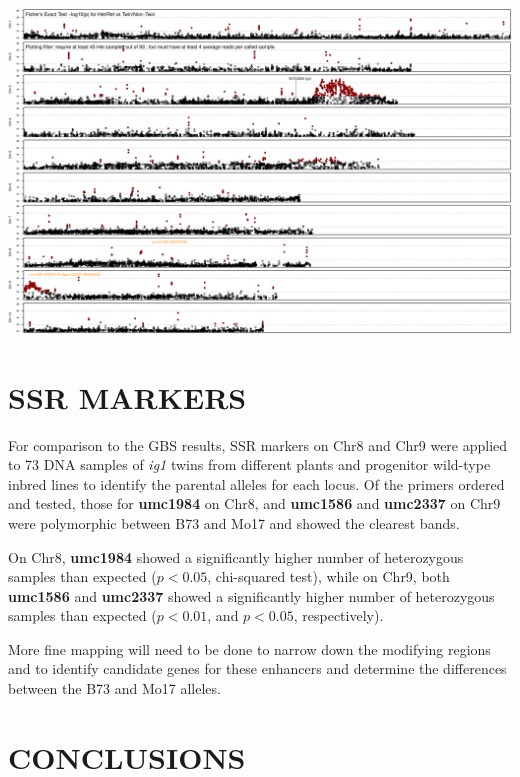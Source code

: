 \documentclass[maize,portrait]{a0poster}
\newlength{\figwidth}
\begin{document}
\begin{multicols}{3}
  \begin{center}
    \includegraphics[width=\figwidth]{Fisher-Het-45}
  \end{center}


  \section*{SSR MARKERS}

  For comparison to the GBS results, SSR markers on Chr8 and Chr9 were applied to 73 DNA samples of \textit{ig1}
  twins from different plants and progenitor wild-type inbred lines to identify the parental alleles for each locus.
  Of the primers ordered and tested, those for \textbf{umc1984} on Chr8, and \textbf{umc1586} and \textbf{umc2337} on Chr9
  were polymorphic between B73 and Mo17 and showed the clearest bands.
  
  On Chr8, \textbf{umc1984} showed a significantly higher number of heterozygous
  samples than expected ($p<0.05$, chi-squared test), while on Chr9, both \textbf{umc1586} and \textbf{umc2337}
  showed a significantly higher number of heterozygous samples than expected ($p<0.01$, and $p<0.05$, respectively).

  More fine mapping will need to be done to narrow down the modifying regions and to identify candidate genes for
  these enhancers and determine the differences between the B73 and Mo17 alleles.

  \section*{CONCLUSIONS}



\end{multicols}
\end{document}
